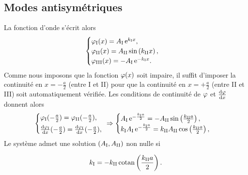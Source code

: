 \documentclass[12pt,fancy]{cours}
\begin{document}
\subsection{Modes antisymétriques}
La fonction d'onde s'écrit alors
\begin{equation}
\begin{cases}
\varphi_{\rm{I}}(x)=A_\mathrm{I}\,\mathrm{e}^{k_\mathrm{I}x},\\
\varphi_{\rm{II}}(x)= A_\mathrm{II}\sin\left(k_\mathrm{II}x\right),\\
\varphi_{\rm{III}}(x)= -A_\mathrm{I}\,\mathrm{e}^{-k_\mathrm{I}x}.
\end{cases}
\label{eq:def_k1_k2}
\end{equation}
Comme nous imposons que la fonction $\varphi(x)$ soit impaire, il suffit d'imposer la continuité en $x=-\frac{a}{2}$ (entre I et II) pour que la continuité en $x=+\frac{a}{2}$ (entre II et III) soit automatiquement vérifiée. Les conditions de continuité de $\varphi$ et $\frac{\mathrm{d}{\varphi}}{\mathrm{d}{x}}$ donnent alors
\begin{equation}
\begin{cases}
\varphi_{\rm{I}}(-\frac{a}{2})=\varphi_{\rm{II}}(-\frac{a}{2}),\\[1mm]
\frac{\mathrm{d}{\varphi_{\rm{I}}}}{\mathrm{d}{x}}(-\frac{a}{2})=\frac{\mathrm{d}{\varphi_{\rm{I}}}}{\mathrm{d}{x}}(-\frac{a}{2}),
\end{cases}
\!\!\!\!\Rightarrow
\begin{cases}
A_\mathrm{I}\,\mathrm{e}^{-\frac{k_\mathrm{I}a}{2}}=-A_\mathrm{II}\sin\left(\frac{k_\mathrm{II}a}{2}\right),\\
k_\mathrm{I}A_\mathrm{I}\,\mathrm{e}^{-\frac{k_\mathrm{I}a}{2}}=k_\mathrm{II}A_\mathrm{II}\cos\left(\frac{k_\mathrm{II}a}{2}\right),
\end{cases}
\label{eqn:cls_puits_fini}
\end{equation}
Le système admet une solution $(A_{\rm{I}},A_{\rm{II}})$ non nulle si
\begin{theorem}\label{form:k2anti}
  \begin{equation*}
k_{\rm{I}}=-k_{\rm{II}}\,{\rm{cotan}} \left(\frac{k_{\rm{II}}a}{2}\right).
  \end{equation*}
\end{theorem}
%
\end{document}
